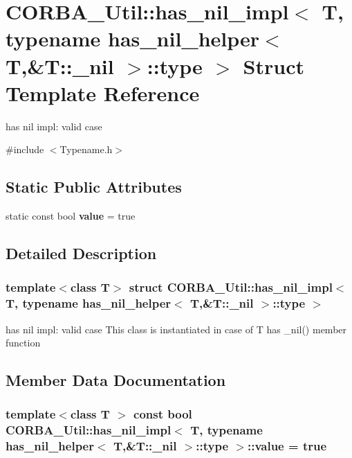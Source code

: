 \section{CORBA\_\-Util::has\_\-nil\_\-impl$<$ T, typename has\_\-nil\_\-helper$<$ T,\&T::\_\-nil $>$::type $>$ Struct Template Reference}
\label{structCORBA__Util_1_1has__nil__impl_3_01T_00_01typename_01has__nil__helper_3_01T_00_6T_1_1__nil_01_4_1_1type_01_4}


has nil impl: valid case  




{\ttfamily \#include $<$Typename.h$>$}

\subsection*{Static Public Attributes}
\begin{DoxyCompactItemize}
\item 
static const bool {\bf value} = true
\end{DoxyCompactItemize}


\subsection{Detailed Description}
\subsubsection*{template$<$class T$>$ struct CORBA\_\-Util::has\_\-nil\_\-impl$<$ T, typename has\_\-nil\_\-helper$<$ T,\&T::\_\-nil $>$::type $>$}

has nil impl: valid case This class is instantiated in case of T has \_\-nil() member function 

\subsection{Member Data Documentation}
\subsubsection[{value}]{\setlength{\rightskip}{0pt plus 5cm}template$<$class T $>$ const bool {\bf CORBA\_\-Util::has\_\-nil\_\-impl}$<$ T, typename {\bf has\_\-nil\_\-helper}$<$ T,\&T::\_\-nil $>$::type $>$::{\bf value} = true\hspace{0.3cm}{\ttfamily  [static]}}\label{structCORBA__Util_1_1has__nil__impl_3_01T_00_01typename_01has__nil__helper_3_01T_00_6T_1_1__nil_01_4_1_1type_01_4_a2dbb211642330d4fc58bc23d32462c8b}
